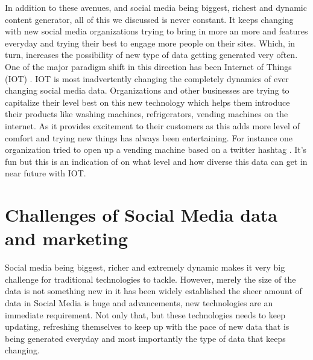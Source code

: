 \documentclass[sigconf]{acmart}
\begin{document}
In addition to these avenues, and social media being biggest, richest and dynamic content generator, all of this we discussed is never constant. It keeps changing with new social media organizations trying to bring in more an more and features everyday and trying their best to engage more people on their sites. Which, in turn, increases the possibility of new type of data getting generated very often. One of the major paradigm shift in this direction has been Internet of Things (IOT) \cite{roberta2} \cite{neilp}. IOT is most inadvertently changing the completely dynamics of ever changing social media data. Organizations and other businesses are trying to capitalize their level best on this new technology which helps them introduce their products like washing machines, refrigerators, vending machines on the internet. As it provides excitement to their customers as this adds more level of comfort and trying new things has always been entertaining. For instance one organization tried to open up a vending machine based on a twitter hashtag \cite{neilp}. It's fun but this is an indication of on what level and how diverse this data can get in near future with IOT.

\section{Challenges of Social Media data and marketing}

Social media being biggest, richer and extremely dynamic makes it very big challenge for traditional technologies to tackle. However, merely the size of the data is not something new in it has been widely established the sheer amount of data in Social Media is huge and advancements, new technologies are an immediate requirement. Not only that, but these technologies needs to keep updating, refreshing themselves to keep up with the pace of new data that is being generated everyday and most importantly the type of data that keeps changing.
\end{document}
